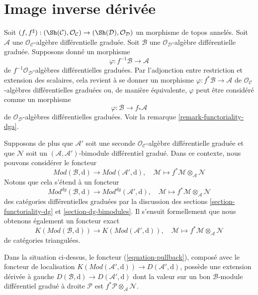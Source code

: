 \section{Image inverse dérivée}
\label{section-derived-pullback}

\noindent
Soit $(f, f^\sharp) : (\Sh(\mathcal{C}), \mathcal{O}_\mathcal{C})
\to (\Sh(\mathcal{D}), \mathcal{O}_\mathcal{D})$ un morphisme
de topos annelés. Soit $\mathcal{A}$ une
$\mathcal{O}_\mathcal{C}$-algèbre différentielle graduée. Soit $\mathcal{B}$ une
$\mathcal{O}_\mathcal{D}$-algèbre différentielle graduée. Supposons donné un
morphisme
$$
\varphi : f^{-1}\mathcal{B} \to \mathcal{A}
$$ de
$f^{-1}\mathcal{O}_\mathcal{D}$-algèbres différentielles graduées. Par l'adjonction
entre restriction et extension des scalaires, cela revient à se donner
un morphisme $\varphi : f^*\mathcal{B} \to \mathcal{A}$ de
$\mathcal{O}_\mathcal{C}$-algèbres différentielles graduées ou, de manière équivalente,
$\varphi$ peut être considéré comme un morphisme
$$
\varphi : \mathcal{B} \to f_*\mathcal{A}
$$
de $\mathcal{O}_\mathcal{D}$-algèbres différentielles graduées.
Voir la remarque \ref{remark-functoriality-dga}.

\medskip\noindent
Supposons de plus que $\mathcal{A}'$ soit une seconde
$\mathcal{O}_\mathcal{C}$-algèbre différentielle graduée et que $\mathcal{N}$ soit un
$(\mathcal{A}, \mathcal{A}')$-bimodule différentiel gradué. Dans
ce contexte, nous pouvons considérer le foncteur
$$
\textit{Mod}(\mathcal{B}, \text{d})
\longrightarrow
\textit{Mod}(\mathcal{A}', \text{d}),\quad
\mathcal{M} \longmapsto f^*\mathcal{M} \otimes_{\mathcal{A}} \mathcal{N}
$$
Notons que cela s'étend à un foncteur
$$
\textit{Mod}^{dg}(\mathcal{B}, \text{d})
\longrightarrow
\textit{Mod}^{dg}(\mathcal{A}', \text{d}),\quad
\mathcal{M} \longmapsto f^*\mathcal{M} \otimes_{\mathcal{A}} \mathcal{N}
$$ des
catégories différentielles graduées par la discussion des
sections \ref{section-functoriality-dg} et \ref{section-dg-bimodules}. Il
s'ensuit formellement que nous obtenons également un foncteur
exact \begin{equation}
\label{equation-pullback}
K(\textit{Mod}(\mathcal{B}, \text{d}))
\longrightarrow
K(\textit{Mod}(\mathcal{A}', \text{d})),\quad
\mathcal{M} \longmapsto f^*\mathcal{M} \otimes_{\mathcal{A}} \mathcal{N}
\end{equation}
de catégories triangulées.

\begin{lemma}
\label{lemma-derived-tensor-product} Dans
la situation ci-dessus, le foncteur (\ref{equation-pullback}),
composé avec le foncteur de localisation
$K(\textit{Mod}(\mathcal{A}', \text{d})) \to D(\mathcal{A}', \text{d})$, possède
une extension dérivée à
gauche $D(\mathcal{B}, \text{d}) \to D(\mathcal{A}', \text{d})$ dont
la valeur sur un bon $\mathcal{B}$-module différentiel gradué à droite
$\mathcal{P}$ est $f^*\mathcal{P} \otimes_\mathcal{A} \mathcal{N}$.
\end{lemma}

